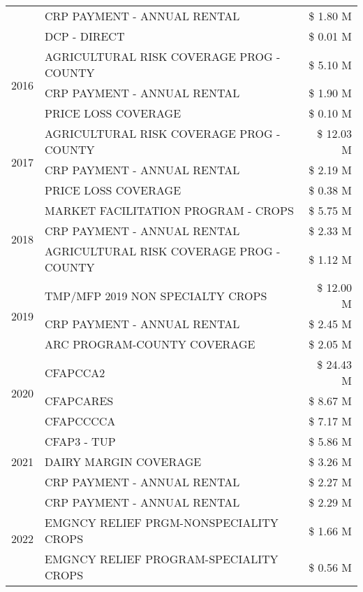 \begin{tabular}{llr}
 & CRP PAYMENT - ANNUAL RENTAL & \$ 1.80 M \\
 & DCP - DIRECT & \$ 0.01 M \\
\cline{1-3}
\multirow[t]{3}{*}{2016} & AGRICULTURAL RISK COVERAGE PROG - COUNTY & \$ 5.10 M \\
 & CRP PAYMENT - ANNUAL RENTAL & \$ 1.90 M \\
 & PRICE LOSS COVERAGE & \$ 0.10 M \\
\cline{1-3}
\multirow[t]{3}{*}{2017} & AGRICULTURAL RISK COVERAGE PROG - COUNTY & \$ 12.03 M \\
 & CRP PAYMENT - ANNUAL RENTAL & \$ 2.19 M \\
 & PRICE LOSS COVERAGE & \$ 0.38 M \\
\cline{1-3}
\multirow[t]{3}{*}{2018} & MARKET FACILITATION PROGRAM - CROPS & \$ 5.75 M \\
 & CRP PAYMENT - ANNUAL RENTAL & \$ 2.33 M \\
 & AGRICULTURAL RISK COVERAGE PROG - COUNTY & \$ 1.12 M \\
\cline{1-3}
\multirow[t]{3}{*}{2019} & TMP/MFP 2019 NON SPECIALTY CROPS & \$ 12.00 M \\
 & CRP PAYMENT - ANNUAL RENTAL & \$ 2.45 M \\
 & ARC PROGRAM-COUNTY COVERAGE & \$ 2.05 M \\
\cline{1-3}
\multirow[t]{3}{*}{2020} & CFAPCCA2 & \$ 24.43 M \\
 & CFAPCARES & \$ 8.67 M \\
 & CFAPCCCCA & \$ 7.17 M \\
\cline{1-3}
\multirow[t]{3}{*}{2021} & CFAP3 - TUP & \$ 5.86 M \\
 & DAIRY MARGIN COVERAGE & \$ 3.26 M \\
 & CRP PAYMENT - ANNUAL RENTAL & \$ 2.27 M \\
\cline{1-3}
\multirow[t]{3}{*}{2022} & CRP PAYMENT - ANNUAL RENTAL & \$ 2.29 M \\
 & EMGNCY RELIEF PRGM-NONSPECIALITY CROPS & \$ 1.66 M \\
 & EMGNCY RELIEF PROGRAM-SPECIALITY CROPS & \$ 0.56 M \\
\cline{1-3}
\bottomrule
\end{tabular}
